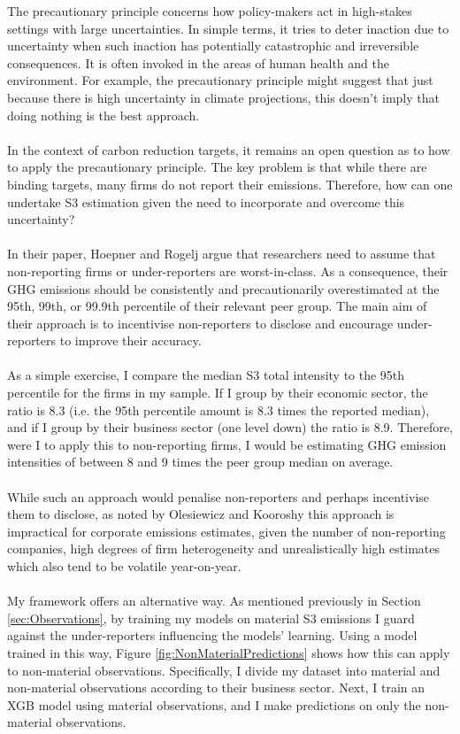 \documentclass[12pt,twoside]{report}
\begin{document}
The precautionary principle concerns how policy-makers act in high-stakes settings with large uncertainties. In simple terms, it tries to deter inaction due to uncertainty when such inaction has potentially catastrophic and irreversible consequences. It is often invoked in the areas of human health and the environment. For example, the precautionary principle might suggest that just because there is high uncertainty in climate projections, this doesn't imply that doing nothing is the best approach. 
\\\\
In the context of carbon reduction targets, it remains an open question as to how to apply the precautionary principle. The key problem is that while there are binding targets, many firms do not report their emissions. Therefore, how can one undertake S3 estimation given the need to incorporate and overcome this uncertainty? 
\\\\
In their paper, Hoepner and Rogelj \cite{Hoepner2021} argue that researchers need to assume that non-reporting firms or under-reporters are worst-in-class. As a consequence, their GHG emissions should be consistently and precautionarily overestimated at the 95th, 99th, or 99.9th percentile of their relevant peer group. The main aim of their approach is to incentivise non-reporters to disclose and encourage under-reporters to improve their accuracy.
\\\\
As a simple exercise, I compare the median S3 total intensity to the 95th percentile for the firms in my sample. If I group by their economic sector, the ratio is 8.3 (i.e. the 95th percentile amount is 8.3 times the reported median), and if I group by their business sector (one level down) the ratio is 8.9. Therefore, were I to apply this to non-reporting firms, I would be estimating GHG emission intensities of between 8 and 9 times the peer group median on average. 
\\\\
While such an approach would penalise non-reporters and perhaps incentivise them to disclose, as noted by Olesiewicz and Kooroshy \cite{olesiewicz2023} this approach is impractical for corporate emissions estimates, given the number of non-reporting companies, high degrees of firm heterogeneity and unrealistically high estimates which also tend to be volatile year-on-year.
\\\\
My framework offers an alternative way. As mentioned previously in Section \ref{sec:Observations}, by training my models on material S3 emissions I guard against the under-reporters influencing the models' learning. Using a model trained in this way, Figure \ref{fig:NonMaterialPredictions} shows how this can apply to non-material observations. Specifically, I divide my dataset into material and non-material observations according to their business sector. Next, I train an XGB model using material observations, and I make predictions on only the non-material observations.
\end{document}
